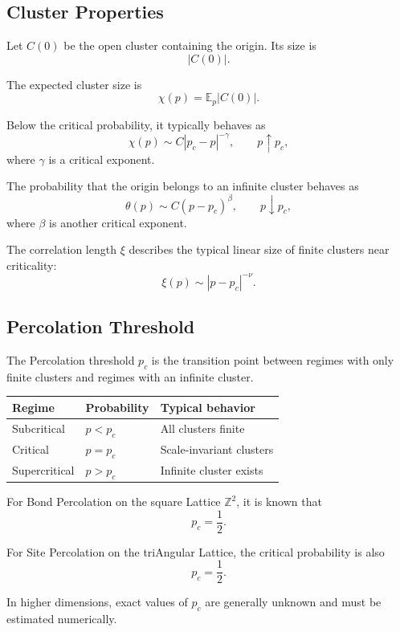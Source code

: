 \documentclass[a4paper, 10pt, onepage]{elegantbook}
\begin{document}
{\subsection{Cluster Properties}

Let \(C(0)\) be the open cluster containing the origin. Its size is
\[
|C(0)|.
\]

The expected cluster size is
\[
\chi(p)
=
\mathbb E_p|C(0)|.
\]

Below the critical probability, it typically behaves as
\[
\chi(p)
\sim
C|p_c-p|^{-\gamma},
\qquad
p\uparrow p_c,
\]
where \(\gamma\) is a critical exponent.

The probability that the origin belongs to an infinite cluster behaves as
\[
\theta(p)
\sim
C(p-p_c)^\beta,
\qquad
p\downarrow p_c,
\]
where \(\beta\) is another critical exponent.

The correlation length \(\xi\) describes the typical linear size of finite
clusters near criticality:
\[
\xi(p)
\sim
|p-p_c|^{-\nu}.
\]

\subsection{Percolation Threshold}

The Percolation threshold \(p_c\) is the transition point between regimes with
only finite clusters and regimes with an infinite cluster.

\begin{center}
\begin{tabular}{lll}
\hline
Regime & Probability & Typical behavior \\
\hline
Subcritical & \(p<p_c\) & All clusters finite \\
Critical & \(p=p_c\) & Scale-invariant clusters \\
Supercritical & \(p>p_c\) & Infinite cluster exists \\
\hline
\end{tabular}
\end{center}

For Bond Percolation on the square Lattice \(\mathbb Z^2\), it is known that
\[
p_c=\frac12.
\]

For Site Percolation on the triAngular Lattice, the critical probability is also
\[
p_c=\frac12.
\]

In higher dimensions, exact values of \(p_c\) are generally unknown and must be
estimated numerically.

}
\end{document}
